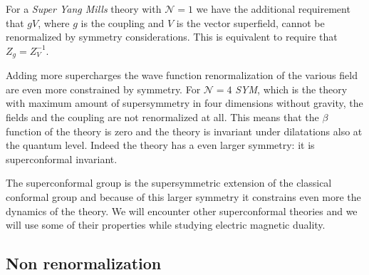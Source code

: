 For a \emph{Super Yang Mills} theory with $\mathcal{N} = 1$ we have the additional requirement that $g V$, where $g$ is the coupling and $V$ is the vector superfield, cannot be renormalized by symmetry considerations. This is equivalent to require that 
$ Z_g = Z_V^{-1}$.

Adding more supercharges the wave function renormalization of the various field are even more constrained by symmetry.
For $\mathcal{N}=4$ \emph{SYM}, which is the  theory with maximum amount of supersymmetry in four dimensions without gravity, the fields and the coupling are not renormalized at all.
This means that the $\beta$ function of the theory is zero and the theory is invariant under dilatations also at the quantum level.
Indeed the theory has a even larger symmetry: it is superconformal invariant.

The superconformal group is the supersymmetric extension of the classical conformal group and because of this larger symmetry it constrains even more the dynamics of the theory. 
We will encounter other superconformal theories and we will use some of their properties while studying electric magnetic duality. 


\subsection{Non renormalization}



\newpage